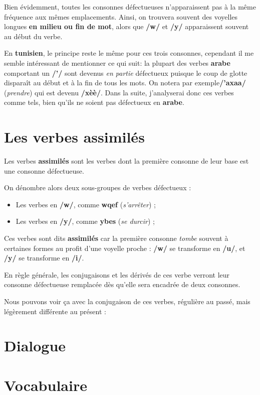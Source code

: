 Bien évidemment, toutes les consonnes défectueuses n'apparaissent pas à la même fréquence aux mêmes emplacements. Ainsi, on trouvera souvent des voyelles longues \textbf{en milieu ou fin de mot}, alors que \textbf{/w/} et \textbf{/y/} apparaissent souvent au début du verbe.

En \textbf{tunisien}, le principe reste le même pour ces trois consonnes, cependant il me semble intéressant de mentionner ce qui suit: la plupart des verbes \textbf{arabe} comportant un \textbf{/'/} sont devenus \textit{en partie} défectueux puisque le coup de glotte disparaît au début et à la fin de tous les mots. On notera par exemple\linebreak \textbf{/'axa\dh a/}  (\textit{prendre}) qui est devenu \textbf{/x\dh èè/}. Dans la suite, j'analyserai donc ces verbes comme tels, bien qu'ils ne soient pas défectueux en \textbf{arabe}.

\section{Les verbes assimilés}
Les verbes \textbf{assimilés} sont les verbes dont la première consonne de leur base est une consonne défectueuse.

On dénombre alors deux sous-groupes de verbes défectueux : 
\begin{itemize}
    \item Les verbes en \textbf{/w/}, comme \textbf{wqef} (\textit{s'arrêter}) ;
    \item Les verbes en \textbf{/y/}, comme \textbf{ybes} (\textit{se durcir}) ;
\end{itemize}

Ces verbes sont dits \textbf{assimilés} car la première consonne \textit{tombe} souvent à certaines formes au profit d'une voyelle proche : \textbf{/w/} se transforme en \textbf{/u/}, et \textbf{/y/} se transforme en \textbf{/i/}.

En règle générale, les conjugaisons et les dérivés de ces verbe verront leur consonne défectueuse remplacée dès qu'elle sera encadrée de deux consonnes.

Nous pouvons voir ça avec la conjugaison de ces verbes, régulière au passé, mais légèrement différente au présent : 


\section*{Dialogue}
\section*{Vocabulaire}